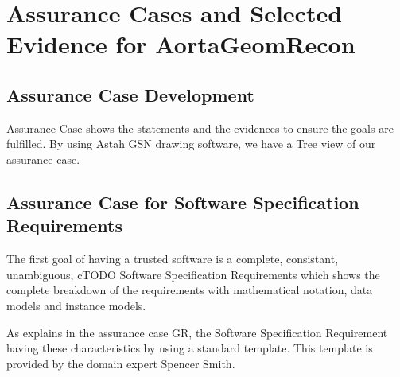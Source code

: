 \chapter{Assurance Cases and Selected Evidence for AortaGeomRecon}

\section{Assurance Case Development}

Assurance Case shows the statements and the evidences to ensure the goals are fulfilled. By using Astah GSN drawing software, we have a Tree view of our assurance case.

\section{Assurance Case for Software Specification Requirements}

The first goal of having a trusted software is a complete, consistant, unambiguous, cTODO Software Specification Requirements \citep{SRS} which shows the complete breakdown of the requirements with mathematical notation, data models and instance models.

As explains in the assurance case GR, the Software Specification Requirement having these characteristics by using a standard template. This template is provided by the domain expert Spencer Smith.

